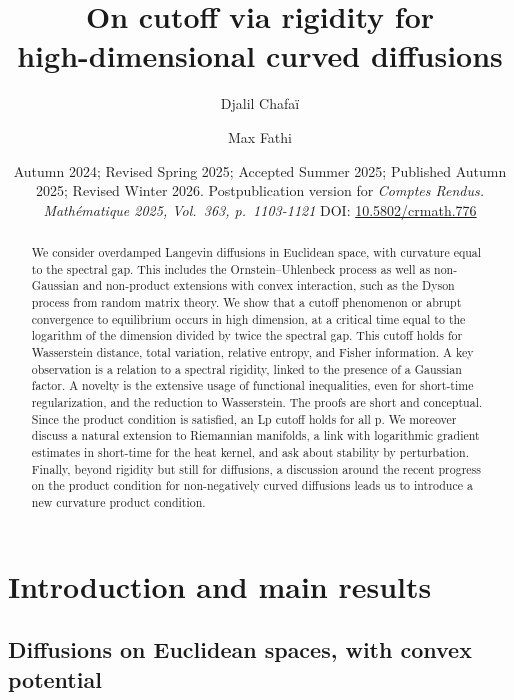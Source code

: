 \documentclass[10pt,reqno]{amsart}
\title[On cutoff via rigidity for high-dimensional curved diffusions]{On cutoff via rigidity for\\high-dimensional curved diffusions}
\date{Autumn 2024; Revised Spring 2025; Accepted Summer 2025; Published Autumn
  2025; Revised Winter 2026. Postpublication version for \emph{Comptes Rendus.
    Mathématique 2025, Vol.~363, p.~1103-1121} DOI:
  \href{https://doi.org/10.5802/crmath.776}{10.5802/crmath.776}}
\author{Djalil Chafaï}
{\footnotesize\address[DC]{DMA, École normale supérieure, 45 rue d'Ulm, 75230, Paris; and CEREMADE, Université Paris-Dauphine, Place du Maréchal de Lattre de Tassigny, 75775, Paris; PSL, CNRS}}
\author{Max Fathi}
{\footnotesize\address[MF]{Université Paris Cité and Sorbonne Université, CNRS, Laboratoire Jacques-Louis Lions and Laboratoire de Probabilités, Statistique et Modélisation, F-75013 Paris, France\\
and DMA, École normale supérieure, Université PSL, CNRS, 75005 Paris, France \\
and Institut Universitaire de France}}
\numberwithin{equation}{section}
\begin{document}
\begin{abstract}
  We consider overdamped Langevin diffusions in Euclidean space, with
  curvature equal to the spectral gap. This includes the
  Ornstein--Uhlenbeck process as well as non-Gaussian and non-product
  extensions with convex interaction, such as the Dyson process from random
  matrix theory. We show that a cutoff phenomenon or abrupt convergence to
  equilibrium occurs in high dimension, at a critical time equal to the
  logarithm of the dimension divided by twice the spectral gap. This cutoff
  holds for Wasserstein distance, total variation, relative entropy, and
  Fisher information. A key observation is a relation to a spectral rigidity,
  linked to the presence of a Gaussian factor. A novelty is the extensive
  usage of functional inequalities, even for short-time regularization, and
  the reduction to Wasserstein. The proofs are short and conceptual. Since the
  product condition is satisfied, an Lp cutoff holds for all p. We moreover
  discuss a natural extension to Riemannian manifolds, a link with logarithmic
  gradient estimates in short-time for the heat kernel, and ask about
  stability by perturbation. Finally, beyond rigidity but still for
  diffusions, a discussion around the recent progress on the product condition
  for non-negatively curved diffusions leads us to introduce a new curvature
  product condition.
\end{abstract}

\maketitle

{\footnotesize\tableofcontents}

\section{Introduction and main results}

\subsection{Diffusions on Euclidean spaces, with convex potential}
\end{document}
